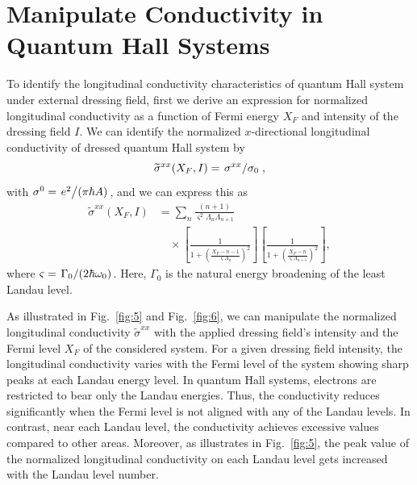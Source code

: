 \documentclass[
 reprint,
 amsmath,amssymb,
 aps,
 prb,
]{revtex4-2}
\begin{document}
\section{\label{sec_manipulate_conductivity} Manipulate Conductivity in Quantum Hall Systems}

To identify the longitudinal conductivity characteristics of quantum Hall system under external dressing field, first we derive an expression for normalized longitudinal conductivity as a function of Fermi energy $X_F$ and intensity of the dressing field $I$.
We can identify the normalized $x$-directional longitudinal conductivity of dressed quantum Hall system by
\begin{equation}\label{eq:37}
  \widetilde{\sigma}^{xx}(X_F,I) =
  \flatfrac{\sigma^{xx}}{\sigma_{0}},
\end{equation}
with $\sigma^0 = \flatfrac{e^2}{(\pi \hbar A)}$, and we can express this as
\begin{equation} \label{eq:38}
  \begin{aligned}
    \widetilde{\sigma}^{xx}(X_F,I) &=
    \sum_{n}
    \frac{(n+1)}{\varsigma^2 \Lambda_n \Lambda_{n+1}} \\
    &\quad\times
    \left[
      \frac{1}
      {
        1 + \left(\frac{X_F - n -1}{\varsigma \Lambda_n}\right)^2
      }
    \right]
    \left[
      \frac{1}
      {
        1 + \left(\frac{X_F - n}{\varsigma \Lambda_{n+1}}\right)^2
      }
    \right],
  \end{aligned}
\end{equation}
where $\varsigma = \flatfrac{\Gamma_0}{(2\hbar \omega_0)}$. Here, $\Gamma_0$ is the natural energy broadening of the least Landau level.

As illustrated in Fig.~\ref{fig:5} and Fig.~\ref{fig:6}, we can manipulate the normalized longitudinal conductivity $\widetilde{\sigma}^{xx}$ with the applied dressing field's intensity and the Fermi level $X_F$ of the considered system.
For a given dressing field intensity, the longitudinal conductivity varies with  the Fermi level of the system showing sharp peaks at each Landau energy level.
In quantum Hall systems, electrons are restricted to bear only the Landau energies. Thus, the conductivity reduces significantly when the Fermi level is not aligned with any of the Landau levels. In contrast, near each Landau level, the conductivity achieves excessive values compared to other areas. Moreover, as illustrates in Fig.~\ref{fig:5}, the peak value of the normalized longitudinal conductivity on each Landau level gets increased with the Landau level number.
\end{document}

